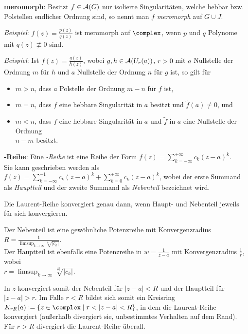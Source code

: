 \textbf{meromorph}:
Besitzt $f \in \mathcal{A}(G)$ nur isolierte Singularitäten, welche hebbar bzw.
Polstellen endlicher Ordnung sind, so nennt man $f$ \emph{meromorph} auf
$G \cup J$.

\emph{Beispiel}:
$f(z) = \frac{p(z)}{q(z)}$ ist meromorph auf $\complex$, wenn
$p$ und $q$ Polynome mit $q(z) \not\equiv 0$ sind.

\emph{Beispiel}:
Ist $f(z) = \frac{g(z)}{h(z)}$, wobei
$g, h \in \mathcal{A}(U_r(a))$, $r > 0$ mit
$a$ Nullstelle der Ordnung $m$ für $h$ und
$a$ Nullstelle der Ordnung $n$ für $g$ ist, so gilt für
\begin{itemize}
    \item
    $m > n$, dass $a$ Polstelle der Ordnung $m - n$ für $f$ ist,
    
    \item
    $m = n$, dass $f$ eine hebbare Singularität in $a$ besitzt und
    $\widetilde{f}(a) \not= 0$, und
    
    \item
    $m < n$, dass $f$ eine hebbare Singularität in $a$ und
    $\widetilde{f}$ in $a$ eine Nullstelle der Ordnung\\
    $n - m$ besitzt.
\end{itemize}

\linie

\textbf{-Reihe}:
Eine \emph{-Reihe} ist eine Reihe der Form
$f(z) = \sum_{k=-\infty}^{+\infty} c_k (z - a)^k$.\\
Sie kann geschrieben werden als
$f(z) = \sum_{k=-\infty}^{-1} c_k (z - a)^k +
\sum_{k=0}^{+\infty} c_k (z - a)^k$, wobei
der erste Summand als \emph{Hauptteil} und der zweite Summand als
\emph{Nebenteil} bezeichnet wird.

Die Laurent-Reihe konvergiert genau dann, wenn Haupt- und Nebenteil jeweils
für sich konvergieren.

Der Nebenteil ist eine gewöhnliche Potenzreihe mit Konvergenzradius
$R = \frac{1}{\limsup_{k \to \infty} \sqrt[k]{|c_k|}}$.\\
Der Hauptteil ist ebenfalls eine Potenzreihe in $w = \frac{1}{z - a}$
mit Konvergenzradius $\frac{1}{r}$, wobei\\
$r = \limsup_{k \to \infty} \sqrt[|k|]{|c_k|}$.

In $z$ konvergiert somit der Nebenteil für $|z - a| < R$ und der Hauptteil
für $|z - a| > r$.
Im Falle $r < R$ bildet sich somit ein Kreisring
$K_{rR}(a) := \{z \in \complex \;|\; r < |z - a| < R\}$,
in dem die Laurent-Reihe konvergiert
(außerhalb divergiert sie, unbestimmtes Verhalten auf dem Rand).
Für $r > R$ divergiert die Laurent-Reihe überall.

